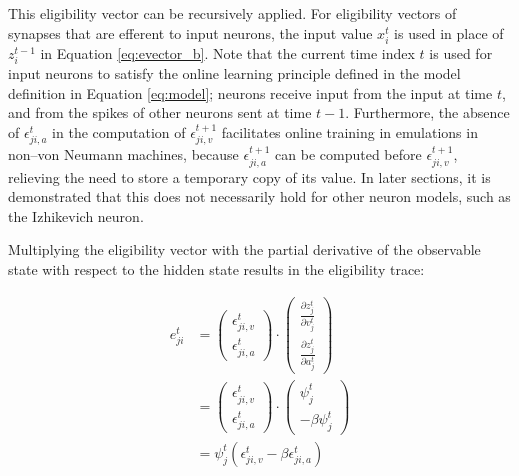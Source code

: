         This eligibility vector can be recursively applied.
        For eligibility vectors of synapses that are efferent to input neurons, the input value $x^t_i$ is used in place of $z_i^{t-1}$ in Equation \ref{eq:evector_b}.
        Note that the current time index $t$ is used for input neurons to satisfy the online learning principle defined in the model definition in Equation \ref{eq:model}; neurons receive input from the input at time $t$, and from the spikes of other neurons sent at time $t-1$.
        Furthermore, the absence of $\epsilon_{ji, a}^t$ in the computation of $\epsilon_{ji, v}^{t+1}$ facilitates online training in emulations in non--von Neumann machines, because $\epsilon_{ji, a}^{t+1}$ can be computed before $\epsilon_{ji, v}^{t+1}$, relieving the need to store a temporary copy of its value.
        In later sections, it is demonstrated that this does not necessarily hold for other neuron models, such as the Izhikevich neuron.

        Multiplying the eligibility vector with the partial derivative of the observable state with respect to the hidden state results in the eligibility trace:

        \begin{align}
        e^t_{ji} &= \begin{pmatrix}
        \epsilon_{ji, v}^t\\
        \epsilon_{ji, a}^t
        \end{pmatrix}
        \cdot
        \begin{pmatrix}
        \frac{\partial z^t_j}{\partial v^t_j}\\
        \frac{\partial z^t_j}{\partial a^t_j}
        \end{pmatrix}\\
        &= \begin{pmatrix}
        \epsilon_{ji, v}^t\\
        \epsilon_{ji, a}^t
        \end{pmatrix}
        \cdot
        \begin{pmatrix}
        \psi^t_j\\
        -\beta\psi^t_j
        \end{pmatrix}\\
        &= \psi^t_j\left(\epsilon_{ji, v}^t - \beta\epsilon_{ji, a}^t\right)
        \end{align}

